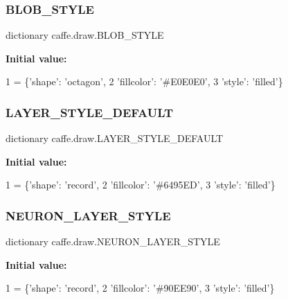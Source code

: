 \subsubsection{\texorpdfstring{B\+L\+O\+B\+\_\+\+S\+T\+Y\+LE}{BLOB\_STYLE}}
{\footnotesize\ttfamily dictionary caffe.\+draw.\+B\+L\+O\+B\+\_\+\+S\+T\+Y\+LE}

{\bfseries Initial value\+:}
\begin{DoxyCode}
1 =  \{\textcolor{stringliteral}{'shape'}: \textcolor{stringliteral}{'octagon'},
2               \textcolor{stringliteral}{'fillcolor'}: \textcolor{stringliteral}{'\#E0E0E0'},
3               \textcolor{stringliteral}{'style'}: \textcolor{stringliteral}{'filled'}\}
\end{DoxyCode}
\mbox{\label{namespacecaffe_1_1draw_a1756d7ea83bb874451506563fc3b0876}} 
\subsubsection{\texorpdfstring{L\+A\+Y\+E\+R\+\_\+\+S\+T\+Y\+L\+E\+\_\+\+D\+E\+F\+A\+U\+LT}{LAYER\_STYLE\_DEFAULT}}
{\footnotesize\ttfamily dictionary caffe.\+draw.\+L\+A\+Y\+E\+R\+\_\+\+S\+T\+Y\+L\+E\+\_\+\+D\+E\+F\+A\+U\+LT}

{\bfseries Initial value\+:}
\begin{DoxyCode}
1 =  \{\textcolor{stringliteral}{'shape'}: \textcolor{stringliteral}{'record'},
2                        \textcolor{stringliteral}{'fillcolor'}: \textcolor{stringliteral}{'\#6495ED'},
3                        \textcolor{stringliteral}{'style'}: \textcolor{stringliteral}{'filled'}\}
\end{DoxyCode}
\mbox{\label{namespacecaffe_1_1draw_a2fb7a9809c0cf095bfdd8e4549db9c0d}} 
\subsubsection{\texorpdfstring{N\+E\+U\+R\+O\+N\+\_\+\+L\+A\+Y\+E\+R\+\_\+\+S\+T\+Y\+LE}{NEURON\_LAYER\_STYLE}}
{\footnotesize\ttfamily dictionary caffe.\+draw.\+N\+E\+U\+R\+O\+N\+\_\+\+L\+A\+Y\+E\+R\+\_\+\+S\+T\+Y\+LE}

{\bfseries Initial value\+:}
\begin{DoxyCode}
1 =  \{\textcolor{stringliteral}{'shape'}: \textcolor{stringliteral}{'record'},
2                       \textcolor{stringliteral}{'fillcolor'}: \textcolor{stringliteral}{'\#90EE90'},
3                       \textcolor{stringliteral}{'style'}: \textcolor{stringliteral}{'filled'}\}
\end{DoxyCode}
